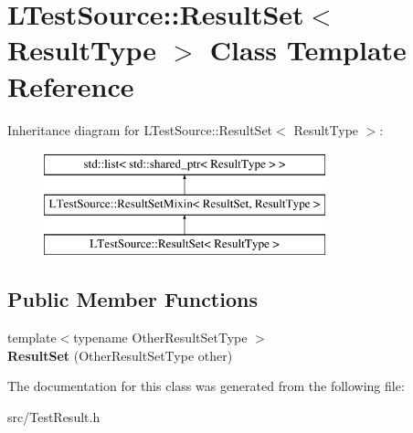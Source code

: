 \hypertarget{class_l_test_source_1_1_result_set}{\section{L\-Test\-Source\-:\-:Result\-Set$<$ Result\-Type $>$ Class Template Reference}
\label{class_l_test_source_1_1_result_set}
}
Inheritance diagram for L\-Test\-Source\-:\-:Result\-Set$<$ Result\-Type $>$\-:\begin{figure}[H]
\begin{center}
\leavevmode
\includegraphics[height=3.000000cm]{class_l_test_source_1_1_result_set}
\end{center}
\end{figure}
\subsection*{Public Member Functions}
\begin{DoxyCompactItemize}
\item 
\hypertarget{class_l_test_source_1_1_result_set_a52cc8ea13c6f2301601c0034afe1c6d3}{{\footnotesize template$<$typename Other\-Result\-Set\-Type $>$ }\\{\bfseries Result\-Set} (Other\-Result\-Set\-Type other)}\label{class_l_test_source_1_1_result_set_a52cc8ea13c6f2301601c0034afe1c6d3}

\end{DoxyCompactItemize}


The documentation for this class was generated from the following file\-:\begin{DoxyCompactItemize}
\item 
src/Test\-Result.\-h\end{DoxyCompactItemize}
